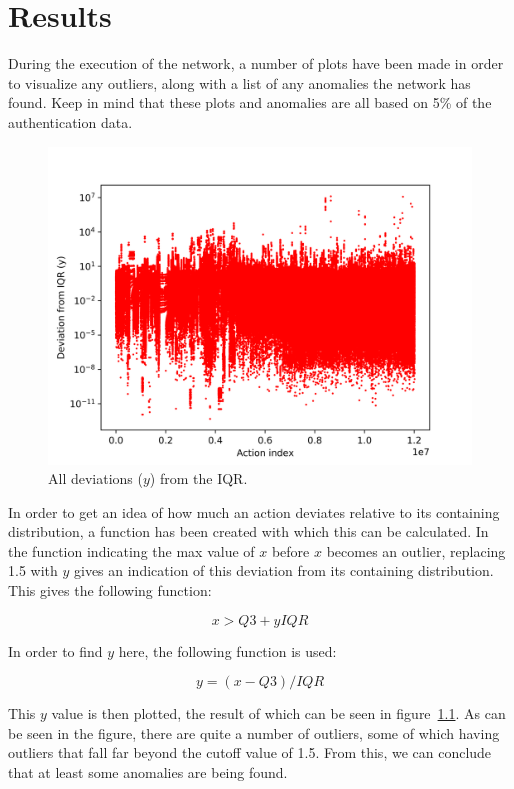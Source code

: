 \chapter{Results}\label{ch:results}

During the execution of the network, a number of plots have been made in order to visualize any outliers, along with a list of any anomalies the network has found. Keep in mind that these plots and anomalies are all based on 5\% of the authentication data.

\begin{figure}
	\begin{center}
		\includegraphics[scale=0.1]{results/all_deviations}
	\end{center}
	\caption{All deviations (\(y\)) from the IQR.~\label{fig:iqr_scale}}
\end{figure}

In order to get an idea of how much an action deviates relative to its containing distribution, a function has been created with which this can be calculated. In the function indicating the max value of \(x\) before \(x\) becomes an outlier, replacing 1.5 with \(y\) gives an indication of this deviation from its containing distribution. This gives the following function:

$$ x > Q3 + y IQR $$

In order to find \(y\) here, the following function is used:

$$ y = (x - Q3) / IQR $$

This \(y\) value is then plotted, the result of which can be seen in figure~\ref{fig:iqr_scale}. As can be seen in the figure, there are quite a number of outliers, some of which having outliers that fall far beyond the cutoff value of 1.5. From this, we can conclude that at least some anomalies are being found. 

